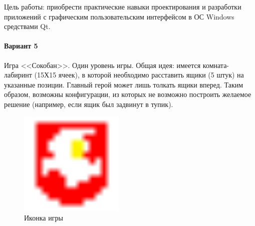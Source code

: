 Цель работы:
приобрести практические навыки проектирования и разработки приложений с графическим
пользовательским интерфейсом в ОС Windows средствами Qt.

\paragraph{Вариант 5}\hspace{0pt}

Игра <<Сокобан>>.
Один уровень игры.
Общая идея: имеется комната-лабиринт (15Х15 ячеек),
в которой необходимо расставить ящики (5 штук) на указанные позиции.
Главный герой может лишь толкать ящики вперед.
Таким образом, возможны конфигурации, из которых не возможно построить желаемое решение
(например, если ящик был задвинут в тупик).

\begin{figure}[!hp]
    \centering
    \includegraphics[width=5cm]
    {../gpi_osisp5_option5/_assets/gpi_MainWindow__favicon.png}
    \caption{Иконка игры}
\end{figure}

